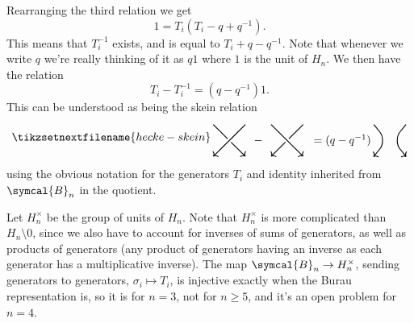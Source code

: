 \documentclass[fleqn]{NotesClass}
\newcommand{\braid}{\symcal{B}}
\begin{document}
    Rearranging the third relation we get
    \begin{equation}
        1 = T_i(T_i - q + q^{-1}).
    \end{equation}
    This means that \(T_i^{-1}\) exists, and is equal to \(T_i + q - q^{-1}\).
    Note that whenever we write \(q\) we're really thinking of it as \(q1\) where \(1\) is the unit of \(H_n\).
    We then have the relation
    \begin{equation}
        T_i - T_i^{-1} = (q - q^{-1}) 1.
    \end{equation}
    This can be understood as being the skein relation
    \begin{equation}
        \tikzsetnextfilename{hecke-skein}
        \begin{tikzpicture}[baseline=(current bounding box)]
            \draw [thick, ->] (0, 1) -- (1, 0);
            \draw [line width=1.5mm, white] (1, 1) -- (0, 0);
            \draw [thick, ->] (1, 1) -- (0, 0);
            \node at (1.4, 0.5) {\(-\)};
            \begin{scope}[xshift=1.8cm]
                \draw [thick, ->] (1, 1) -- (0, 0);
                \draw [line width=1.5mm, white] (0, 1) -- (1, 0);
                \draw [thick, ->] (0, 1) -- (1, 0);
                \node [right] at (1.1, 0.5) {\({}= (q - q^{-1})\)};
            \end{scope}
            \begin{scope}[xshift=5cm]
                \draw [thick, rounded corners=10] (0, 1) -- (0.4, 0.5) -- (0, 0);
                \draw [thick, rounded corners=10] (1, 1) -- (0.6, 0.5) -- (1, 0);
                \draw [thick, ->] (0, 0) -- ++ (-0.01, -0.01);
                \draw [thick, ->] (1, 0) -- ++ (0.01, -0.01);
            \end{scope}
        \end{tikzpicture}
    \end{equation}
    using the obvious notation for the generators \(T_i\) and identity inherited from \(\braid_n\) in the quotient.
    
    Let \(H_n^{\times}\) be the group of units of \(H_n\).
    Note that \(H_n^{\times}\) is more complicated than \(H_n \setminus 0\), since we also have to account for inverses of sums of generators, as well as products of generators (any product of generators having an inverse as each generator has a multiplicative inverse).
    The map \(\braid_n \to H_n^{\times}\), sending generators to generators, \(\sigma_i \mapsto T_i\), is injective exactly when the Burau representation is, so it is for \(n = 3\), not for \(n \ge 5\), and it's an open problem for \(n = 4\).
    
\end{document}
